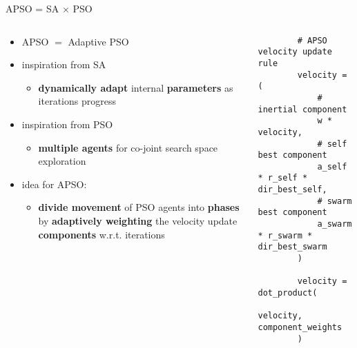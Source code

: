 \documentclass[11pt,aspectratio=169]{beamer}
\begin{document}
%
%

\begin{frame}[fragile]{APSO = SA $\times$ PSO}
    \begin{columns}
    \begin{column}{0.45\textwidth}
        \begin{itemize}
            \item APSO $=$ Adaptive PSO
            \item inspiration from SA
            \begin{itemize}
                \item \textbf{dynamically adapt} internal \textbf{parameters} as iterations progress
            \end{itemize}
            \item inspiration from PSO
            \begin{itemize}
                \item \textbf{multiple agents} for co-joint search space exploration
            \end{itemize}
            \item idea for APSO:
            \begin{itemize}
                \item \textbf{divide movement} of PSO agents into \textbf{phases} by \textbf{adaptively weighting} the velocity update \textbf{components} w.r.t. iterations
            \end{itemize}
        \end{itemize}
    \end{column}

    \begin{column}{0.6\textwidth}
        \begin{verbatim}
        # APSO velocity update rule
        velocity = (
            # inertial component
            w * velocity,
            # self best component
            a_self * r_self * dir_best_self,
            # swarm best component
            a_swarm * r_swarm * dir_best_swarm
        )

        velocity = dot_product(
            velocity, component_weights
        )
        \end{verbatim}
    \end{column}
    \end{columns}
\end{frame}

%
%
\end{document}
